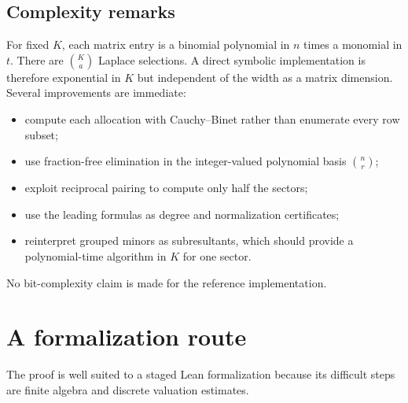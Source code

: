 \documentclass[11pt]{article}
\theoremstyle{definition}
\theoremstyle{remark}
\theoremstyle{definition}
\theoremstyle{plain}
\numberwithin{equation}{section}
\begin{document}

\subsection{Complexity remarks}
For fixed $K$, each matrix entry is a binomial polynomial in $n$ times a
monomial in $t$.  There are $\binom Ka$ Laplace selections.  A direct symbolic
implementation is therefore exponential in $K$ but independent of the width
as a matrix dimension.  Several improvements are immediate:
\begin{itemize}
\item compute each allocation with Cauchy--Binet rather than enumerate every
      row subset;
\item use fraction-free elimination in the integer-valued polynomial basis
      $\binom nr$;
\item exploit reciprocal pairing to compute only half the sectors;
\item use the leading formulas as degree and normalization certificates;
\item reinterpret grouped minors as subresultants, which should provide a
      polynomial-time algorithm in $K$ for one sector.
\end{itemize}
No bit-complexity claim is made for the reference implementation.

\section{A formalization route}
\label{sb:sec:formalization}
The proof is well suited to a staged Lean formalization because its difficult
steps are finite algebra and discrete valuation estimates.
\end{document}
